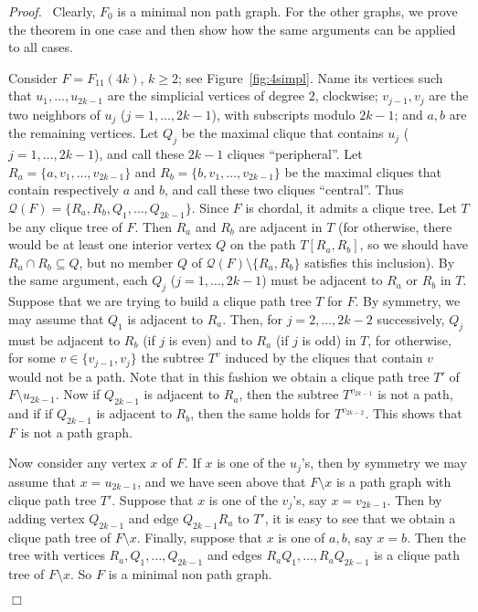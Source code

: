 \documentclass[11pt]{article}
\newenvironment{proof}{\noindent \emph{Proof.}\ }{\hfill
    $\Box$\vspace{1em}}
\begin{document}
\begin{proof}
Clearly, $F_0$ is a minimal non path graph.  For the other graphs, we
prove the theorem in one case and then show how the same arguments can
be applied to all cases.

Consider $F=F_{11}(4k)$, $k\ge 2$; see Figure~\ref{fig:4simpl}.  Name
its vertices such that $u_1, \ldots, u_{2k-1}$ are the simplicial
vertices of degree $2$, clockwise; $v_{j-1}, v_j$ are the two
neighbors of $u_j$ ($j=1, \ldots, {2k-1}$), with subscripts modulo
$2k-1$; and $a,b$ are the remaining vertices.  Let $Q_j$ be the
maximal clique that contains $u_j$ ($j=1, \ldots, {2k-1}$), and call
these $2k-1$ cliques ``peripheral''.  Let $R_a=\{a, v_1, \ldots,
v_{2k-1}\}$ and $R_b=\{b, v_1, \ldots, v_{2k-1}\}$ be the maximal
cliques that contain respectively $a$ and $b$, and call these two
cliques ``central''.  Thus $\mathcal Q(F)=\{R_a, R_b, Q_1, \ldots,
Q_{2k-1}\}$.  Since $F$ is chordal, it admits a clique tree.  Let $T$
be any clique tree of $F$.  Then $R_a$ and $R_b$ are adjacent in $T$
(for otherwise, there would be at least one interior vertex $Q$ on the
path $T[R_a, R_b]$, so we should have $R_a\cap R_b\subseteq Q$, but no
member $Q$ of $\mathcal Q(F)\setminus\{R_a, R_b\}$ satisfies this
inclusion).  By the same argument, each $Q_j$ ($j=1, \ldots, 2k-1$)
must be adjacent to $R_a$ or $R_b$ in $T$.  Suppose that we are trying
to build a clique path tree $T$ for $F$.  By symmetry, we may assume
that $Q_1$ is adjacent to $R_a$.  Then, for $j=2, \ldots, 2k-2$
successively, $Q_j$ must be adjacent to $R_b$ (if $j$ is even) and to
$R_a$ (if $j$ is odd) in $T$, for otherwise, for some $v\in\{v_{j-1},
v_j\}$ the subtree $T^v$ induced by the cliques that contain $v$ would
not be a path.  Note that in this fashion we obtain a clique path tree
$T'$ of $F\setminus u_{2k-1}$.  Now if $Q_{2k-1}$ is adjacent to
$R_a$, then the subtree $T^{v_{2k-1}}$ is not a path, and if if
$Q_{2k-1}$ is adjacent to $R_b$, then the same holds for
$T^{v_{2k-2}}$.  This shows that $F$ is not a path graph.

Now consider any vertex $x$ of $F$.  If $x$ is one of the $u_j$'s,
then by symmetry we may assume that $x=u_{2k-1}$, and we have seen
above that $F\setminus x$ is a path graph with clique path tree $T'$.
Suppose that $x$ is one of the $v_j$'s, say $x=v_{2k-1}$.  Then by
adding vertex $Q_{2k-1}$ and edge $Q_{2k-1}R_a$ to $T'$, it is easy to
see that we obtain a clique path tree of $F\setminus x$.  Finally,
suppose that $x$ is one of $a,b$, say $x=b$.  Then the tree with
vertices $R_a, Q_1, \ldots, Q_{2k-1}$ and edges $R_aQ_1, \ldots,
R_aQ_{2k-1}$ is a clique path tree of $F\setminus x$.  So $F$ is a
minimal non path graph.


\end{proof}
\end{document}
